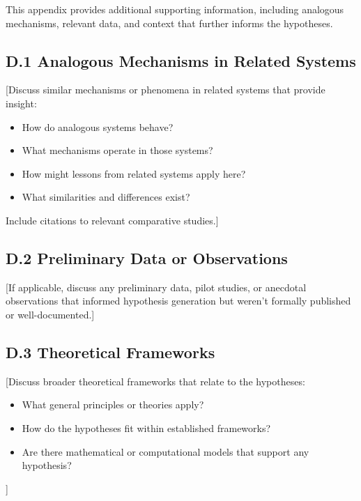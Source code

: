 \documentclass[11pt,letterpaper]{article}
\begin{document}
\newpage
{}

This appendix provides additional supporting information, including analogous mechanisms, relevant data, and context that further informs the hypotheses.

\subsection*{D.1 Analogous Mechanisms in Related Systems}

[Discuss similar mechanisms or phenomena in related systems that provide insight:
\begin{itemize}
  \item How do analogous systems behave?
  \item What mechanisms operate in those systems?
  \item How might lessons from related systems apply here?
  \item What similarities and differences exist?
\end{itemize}

Include citations to relevant comparative studies.]

\subsection*{D.2 Preliminary Data or Observations}

[If applicable, discuss any preliminary data, pilot studies, or anecdotal observations that informed hypothesis generation but weren't formally published or well-documented.]

\subsection*{D.3 Theoretical Frameworks}

[Discuss broader theoretical frameworks that relate to the hypotheses:
\begin{itemize}
  \item What general principles or theories apply?
  \item How do the hypotheses fit within established frameworks?
  \item Are there mathematical or computational models that support any hypothesis?
\end{itemize}]
\end{document}
